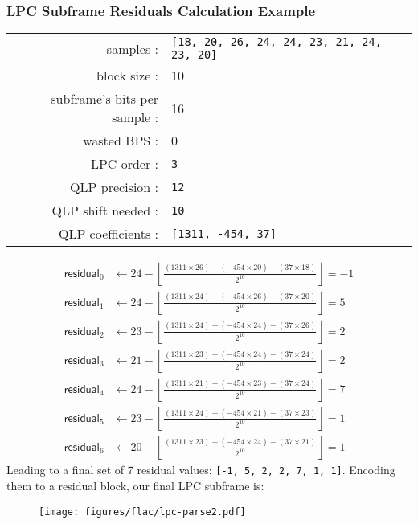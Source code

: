 \subsubsection{LPC Subframe Residuals Calculation Example}
{
  \begin{tabular}{rl}
    \textsf{samples} : & \texttt{[18, 20, 26, 24, 24, 23, 21, 24, 23, 20]} \\
    \textsf{block size} : & 10 \\
    \textsf{subframe's bits per sample} : & 16 \\
    \textsf{wasted BPS} : & 0 \\
    \textsf{LPC order} : & \texttt{3} \\
    \textsf{QLP precision} : &\texttt{12} \\
    \textsf{QLP shift needed} : & \texttt{10} \\
    \textsf{QLP coefficients} : & \texttt{[1311, -454, 37]} \\
  \end{tabular}
  \newline
  \begin{align*}
    \textsf{residual}_0 &\leftarrow 24 - \left\lfloor\frac{(1311 \times 26) + (-454 \times 20) + (37 \times 18)}{2 ^ {10}}\right\rfloor = -1 \\
    \textsf{residual}_1 &\leftarrow 24 - \left\lfloor\frac{(1311 \times 24) + (-454 \times 26) + (37 \times 20)}{2 ^ {10}}\right\rfloor = 5 \\
    \textsf{residual}_2 &\leftarrow 23 - \left\lfloor\frac{(1311 \times 24) + (-454 \times 24) + (37 \times 26)}{2 ^ {10}}\right\rfloor = 2 \\
    \textsf{residual}_3 &\leftarrow 21 - \left\lfloor\frac{(1311 \times 23) + (-454 \times 24) + (37 \times 24)}{2 ^ {10}}\right\rfloor = 2 \\
    \textsf{residual}_4 &\leftarrow 24 - \left\lfloor\frac{(1311 \times 21) + (-454 \times 23) + (37 \times 24)}{2 ^ {10}}\right\rfloor = 7 \\
    \textsf{residual}_5 &\leftarrow 23 - \left\lfloor\frac{(1311 \times 24) + (-454 \times 21) + (37 \times 23)}{2 ^ {10}}\right\rfloor = 1 \\
    \textsf{residual}_6 &\leftarrow 20 - \left\lfloor\frac{(1311 \times 23) + (-454 \times 24) + (37 \times 21)}{2 ^ {10}}\right\rfloor = 1
  \end{align*}
  Leading to a final set of 7 residual values: \texttt{[-1, 5, 2, 2, 7, 1, 1]}.
  Encoding them to a residual block, our final LPC subframe is:
}
\begin{figure}[h]
\texttt{[image: figures/flac/lpc-parse2.pdf]}
\end{figure}

